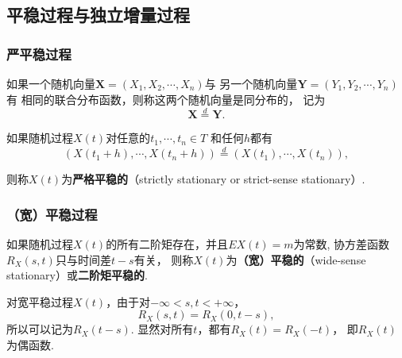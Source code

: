 \subsection{平稳过程与独立增量过程}

\begin{frame}
    \frametitle{严平稳过程}
    \begin{mydefinition}[同分布的随机向量]
        如果一个随机向量$\bm X=(X_1,X_2,\cdots,X_n)$与
        另一个随机向量$\bm Y=(Y_1,Y_2,\cdots,Y_n)$有
        相同的联合分布函数，则称这两个随机向量是同分布的，
        记为
        $$
          \bm X\overset{d}{=}\bm Y.
        $$        
    \end{mydefinition}

    \begin{mydefinition}[严平稳过程]
        如果随机过程$X(t)$对任意的$t_1,\cdots,t_n\in T$
        和任何$h$都有
        \begin{equation}\label{eq:strictly-stationary}
            (X(t_1+h),\cdots,X(t_n+h))\overset{d}{=} (X(t_1),\cdots,X(t_n)),            
        \end{equation}

        则称$X(t)$为\textbf{严格平稳的}（strictly stationary or strict-sense stationary）. 
    \end{mydefinition}

\end{frame}

\begin{frame}
    \frametitle{（宽）平稳过程}
    \begin{mydefinition}[宽平稳过程]
        如果随机过程$X(t)$的所有二阶矩存在，并且$EX(t)=m$为常数,
        协方差函数$R_X(s,t)$只与时间差$t-s$有关，
        则称$X(t)$为\textbf{（宽）平稳的}（wide-sense stationary）或\textbf{二阶矩平稳的}. 
    \end{mydefinition}
    对宽平稳过程$X(t)$，由于对$-\infty<s,t<+\infty$，
    $$
        R_X(s,t)=R_X(0,t-s),
    $$
    所以可以记为$R_X(t-s)$. 显然对所有$t$，都有$R_X(t)=R_X(-t)$，
    即$R_X(t)$为偶函数. 

\end{frame}


